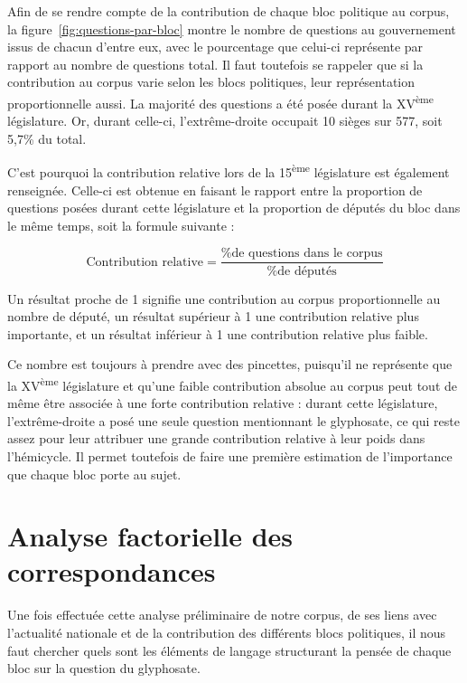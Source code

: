 \documentclass[12pt,twocolumn,landscape]{article}
\begin{document}
    Afin de se rendre compte de la contribution de chaque bloc politique au corpus,
    la figure~\ref{fig:questions-par-bloc} montre le nombre
    de questions au gouvernement issus de chacun d'entre eux,
    avec le pourcentage que celui-ci représente par rapport au nombre
    de questions total.
    Il faut toutefois se rappeler que si la contribution
    au corpus varie selon les blocs politiques,
    leur représentation proportionnelle aussi.
    La majorité des questions a été posée durant la XV\textsuperscript{ème}
    législature.
    Or, durant celle-ci, l'extrême-droite occupait 10 sièges sur 577,
    soit 5,7\% du total.

    C'est pourquoi la contribution relative lors de la 15\textsuperscript{ème}
    législature est également renseignée.
    Celle-ci est obtenue en faisant le rapport entre la proportion
    de questions posées durant cette législature et la proportion
    de députés du bloc dans le même temps, soit la formule suivante :

    $$
    \text{Contribution relative} = \frac{\text{\% de questions dans le corpus}}{\text{\% de députés}}
    $$

    Un résultat proche de 1 signifie une contribution au corpus
    proportionnelle au nombre de député, un résultat supérieur
    à 1 une contribution relative plus importante,
    et un résultat inférieur à 1 une contribution relative plus faible.

    Ce nombre est toujours à prendre avec des pincettes,
    puisqu'il ne représente que la XV\textsuperscript{ème}
    législature et qu'une faible contribution absolue
    au corpus peut tout de même être associée à une
    forte contribution relative :
    durant cette législature, l'extrême-droite a posé une seule
    question mentionnant le glyphosate, ce qui reste assez pour
    leur attribuer une grande contribution relative à leur poids
    dans l'hémicycle.
    Il permet toutefois de faire une première estimation
    de l'importance que chaque bloc porte au sujet.


    \section{Analyse factorielle des correspondances}\label{sec:analyse-factorielle-des-correspondances}

    Une fois effectuée cette analyse préliminaire de notre
    corpus, de ses liens avec l'actualité nationale
    et de la contribution des différents blocs politiques,
    il nous faut chercher quels sont les éléments de langage
    structurant la pensée de chaque bloc sur la question
    du glyphosate.
\end{document}
